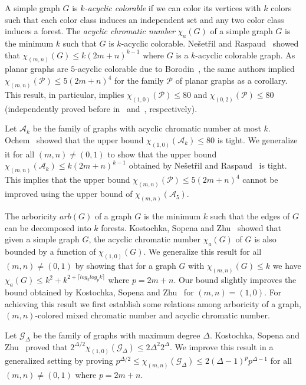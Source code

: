\documentclass[11pt]{article}
\begin{document}
A simple graph $G$ is \textit{$k$-acyclic colorable} if we can color its vertices with $k$ colors such that each color class induces an independent set and any two color class induces a forest. 
The \textit{acyclic chromatic number} $\chi_a(G)$ of a simple graph $G$ is the minimum  $k$ 
such that $G$ is $k$-acyclic colorable. 
Ne\v{s}et\v{r}il and Raspaud~\cite{raspaud_and_nesetril} showed that $\chi_{(m,n)}(G) \leq k(2m+n)^{k-1}$ where $G$ is a $k$-acyclic colorable graph. 
As planar graphs are $5$-acyclic colorable due to Borodin~\cite{Borodinacyclic}, the same authors implied 
 $\chi_{(m,n)}(\mathcal{P}) \leq 5(2m+n)^4$ for the family $\mathcal{P}$ of planar graphs as a corollary.
This result, in particular, implies $\chi_{(1,0)}(\mathcal{P}) \leq 80$ and $\chi_{(0,2)}(\mathcal{P}) \leq 80$ (independently proved 
before in~\cite{planar80} and~\cite{Marshall-edgecoloring}, respectively). 


 Let $\mathcal{A}_k$ be the family of graphs with acyclic chromatic number at most $k$. Ochem~\cite{Ochem_negativeresults} showed that the upper bound  $\chi_{(1,0)}(\mathcal{A}_k) \leq 80$   is tight.  
We generalize it for all $(m,n) \neq (0,1)$ to show that the upper bound $\chi_{(m,n)}(\mathcal{A}_k) \leq k(2m+n)^{k-1}$
 obtained by Ne\v{s}et\v{r}il and Raspaud~\cite{raspaud_and_nesetril}
is tight. 
This implies that the upper bound $\chi_{(m,n)}(\mathcal{P}) \leq 5(2m+n)^4$ cannot be improved using
the upper bound of $\chi_{(m,n)}(\mathcal{A}_5)$.  



The arboricity $arb(G)$ of a graph $G$ is the minimum $k$ such that the edges of $G$ can be decomposed into $k$ forests. 
Kostochka, Sopena and Zhu~\cite{Kostochka97acyclicand} showed that given a simple graph $G$, the acyclic chromatic number $\chi_a(G)$ of $G$ is also bounded by a function of  $\chi_{(1,0)}(G)$. 
We generalize this result for all $(m,n) \neq (0,1)$ by showing that for a graph $G$ with 
$\chi_{(m,n)}(G) \leq k$ we have 
$\chi_a(G) \leq k^2 + k^{2 + \lceil log_2 log_p k \rceil}$ where $p = 2m+n$. Our bound slightly improves the bound obtained by  Kostochka, Sopena and Zhu~\cite{Kostochka97acyclicand} for $(m,n) = (1,0)$.
For achieving this result we first establish some relations among arboricity of a graph, $(m,n)$-colored mixed chromatic number and 
acyclic chromatic number. 



 Let $\mathcal{G}_{\Delta}$ be the family of graphs with maximum degree  $\Delta$.
Kostochka, Sopena and Zhu~\cite{Kostochka97acyclicand} proved that $2^{\Delta/2}  \chi_{(1,0)}(\mathcal{G}_{\Delta}) \leq 2\Delta^2 2^{\Delta}$.
We improve this result in a generalized setting by proving $p^{\Delta/2}   \leq  \chi_{(m,n)}(\mathcal{G}_{\Delta}) \leq 2(\Delta-1)^p p^{\Delta-1}$ for all  $(m,n) \neq (0,1)$ where 
$p = 2m+n$.
\end{document}
